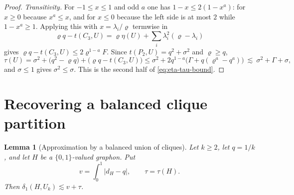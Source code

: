 \documentclass[11pt]{article}
\newtheorem{lemma}[theorem]{Lemma}
\theoremstyle{remark}
\newcommand{\abs}[1]{\left\lvert #1\right\rvert}
\begin{document}
\begin{proof}
\emph{Transitivity.}
For $-1\leq x\leq1$ and odd $a$ one has $1-x\leq2(1-x^a)$: for $x\geq0$
because $x^a\leq x$, and for $x\leq0$ because the left side is at most
$2$ while $1-x^a\geq1$. Applying this with $x=\lambda_i/\varrho$ termwise
in
\[
 \varrho q-t(C_3,U)
 =\varrho\eta(U)+\sum_i\lambda_i^2(\varrho-\lambda_i)
\]
gives $\varrho q-t(C_3,U)\leq2\varrho^{1-a}F$. Since
$t(P_2,U)=q^2+\sigma^2$ and $\varrho\geq q$,
\[
 \tau(U)=\sigma^2+\bigl(q^2-\varrho q\bigr)
 +\bigl(\varrho q-t(C_3,U)\bigr)
 \leq\sigma^2+2q^{1-a}\bigl(\Gamma+q(\varrho^a-q^a)\bigr)
 \ \lesssim\ \sigma^2+\Gamma+\sigma ,
\]
and $\sigma\leq1$ gives $\sigma^2\leq\sigma$. This is the second half of
\eqref{eq:eta-tau-bound}.
\end{proof}

\section{Recovering a balanced clique partition}
\label{sec:rounding}

\begin{lemma}[Approximation by a balanced union of cliques]
\label{lem:rounding}
Let $k\geq2$, let $q=1/k$, and let $H$ be a $\{0,1\}$-valued graphon.
Put
\[
 v=\int_0^1\abs{d_H-q},\qquad \tau=\tau(H).
\]
Then $\delta_1(H,U_k)\lesssim v+\tau$.
\end{lemma}
\end{document}
